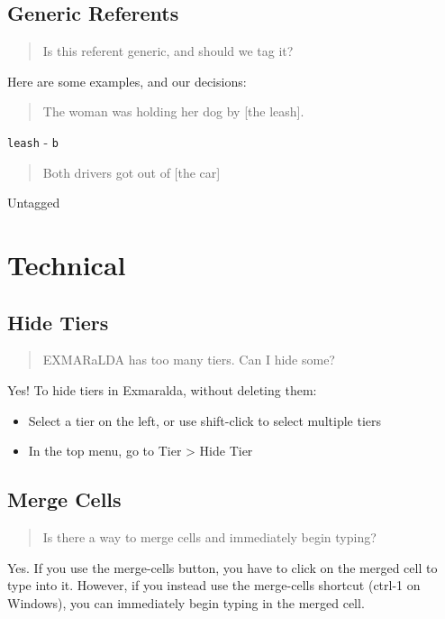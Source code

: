 \documentclass[
]{book}
\providecommand{\tightlist}{%
  \setlength{\itemsep}{0pt}\setlength{\parskip}{0pt}}
\begin{document}
\hypertarget{generic-referents}{%
\subsection{Generic Referents}\label{generic-referents}}

\begin{quote}
Is this referent generic, and should we tag it?
\end{quote}

Here are some examples, and our decisions:

\begin{quote}
The woman was holding her dog by {[}the leash{]}.
\end{quote}

\texttt{leash} - \texttt{b}

\begin{quote}
Both drivers got out of {[}the car{]}
\end{quote}

Untagged

\hypertarget{technical}{%
\section{Technical}\label{technical}}

\hypertarget{hide-tiers}{%
\subsection{Hide Tiers}\label{hide-tiers}}

\begin{quote}
EXMARaLDA has too many tiers. Can I hide some?
\end{quote}

Yes! To hide tiers in Exmaralda, without deleting them:

\begin{itemize}
\tightlist
\item
  Select a tier on the left, or use shift-click to select multiple tiers
\item
  In the top menu, go to Tier \textgreater{} Hide Tier
\end{itemize}

\hypertarget{merge-cells}{%
\subsection{Merge Cells}\label{merge-cells}}

\begin{quote}
Is there a way to merge cells and immediately begin typing?
\end{quote}

Yes.
If you use the merge-cells button, you have to click on the merged cell to type into it.
However, if you instead use the merge-cells shortcut (ctrl-1 on Windows), you can immediately begin typing in the merged cell.
\end{document}
